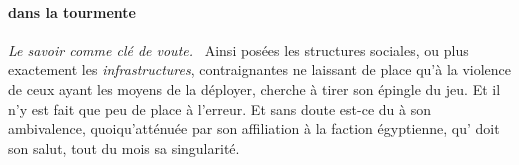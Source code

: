 
\paragraph{\elena{} dans la tourmente}
{\em\normalsize Le savoir comme clé de voute.}~
Ainsi posées les structures sociales, ou plus exactement les \emph{infrastructures}, contraignantes ne laissant de place qu’à la violence de ceux ayant les moyens de la déployer, \elena{} cherche à tirer son épingle du jeu.
Et il n’y est fait que peu de place à l’erreur. Et sans doute est-ce du à son ambivalence, quoiqu’atténuée par son affiliation à la faction égyptienne, qu’\elena{}  doit son salut, tout du mois sa singularité.

